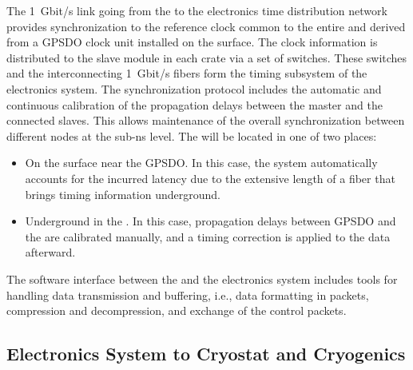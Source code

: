 The \SI{1}{Gbit/s} link going from the  to the \dual electronics time distribution network provides synchronization to the reference clock common %
to the entire  and derived from a GPSDO clock unit installed on the surface. The clock information is distributed to the  slave module in each  crate via a set of  switches. These switches and the interconnecting \SI{1}{Gbit/s} fibers form the timing subsystem of the \dual electronics system. %
The  synchronization protocol includes the automatic and continuous calibration of the propagation delays between the master and the connected slaves. This allows maintenance of the  overall synchronization between different nodes at the sub-ns level. The  will be located in one of two places:
\begin{itemize}
\item{On the surface near the GPSDO. In this case, the system automatically accounts for the incurred latency due to the extensive length of a fiber that brings timing information underground.}
\item{Underground in the . In this case, propagation delays between GPSDO and the  are calibrated manually, and a timing correction is applied to the data afterward.}
\end{itemize} 


The software interface between the  and the electronics system includes tools for handling data transmission and buffering, i.e.,  data formatting in  packets, compression and decompression, and exchange of the control packets.

\subsection{Electronics System to Cryostat and Cryogenics}
\label{ssec:dp-tpcelec-intfc-cryo}

